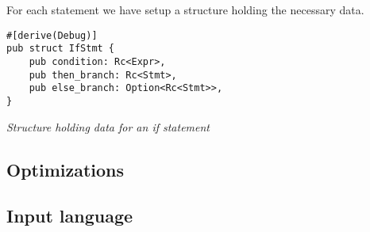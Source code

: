 \documentclass{article}
\begin{document}
For each statement we have setup a structure holding the necessary data.


\begin{verbatim}
#[derive(Debug)]
pub struct IfStmt {
    pub condition: Rc<Expr>,
    pub then_branch: Rc<Stmt>,
    pub else_branch: Option<Rc<Stmt>>,
}
\end{verbatim}
\textit{Structure holding data for an if statement}


\subsection{Optimizations} %

\subsection{Input language} %
\label{sec:input_language}

\clearpage


\end{document}
